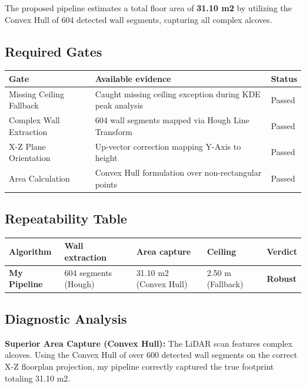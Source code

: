\documentclass[11pt,a4paper]{article}
\begin{document}
The proposed pipeline estimates a total floor area of \textbf{31.10 m2} by utilizing the Convex Hull of 604 detected wall segments, capturing all complex alcoves.

\subsection{Required Gates}
\begin{table}[h]
\centering
\begin{tabularx}{\textwidth}{|l|X|l|}
\hline
\textbf{Gate} & \textbf{Available evidence} & \textbf{Status} \\ \hline
Missing Ceiling Fallback & Caught missing ceiling exception during KDE peak analysis & Passed \\ \hline
Complex Wall Extraction & 604 wall segments mapped via Hough Line Transform & Passed \\ \hline
X-Z Plane Orientation & Up-vector correction mapping Y-Axis to height & Passed \\ \hline
Area Calculation & Convex Hull formulation over non-rectangular points & Passed \\ \hline
\end{tabularx}
\end{table}

\subsection{Repeatability Table}
\begin{table}[h]
\centering
\begin{tabularx}{\textwidth}{|l|X|l|l|l|}
\hline
\textbf{Algorithm} & \textbf{Wall extraction} & \textbf{Area capture} & \textbf{Ceiling} & \textbf{Verdict} \\ \hline
\textbf{My Pipeline} & 604 segments (Hough) & 31.10 m2 (Convex Hull) & 2.50 m (Fallback) & \textbf{Robust} \\ \hline
\end{tabularx}
\end{table}

\subsection{Diagnostic Analysis}
\textbf{Superior Area Capture (Convex Hull):} The LiDAR scan features complex alcoves. Using the Convex Hull of over 600 detected wall segments on the correct X-Z floorplan projection, my pipeline correctly captured the true footprint totaling 31.10 m2.
\end{document}
